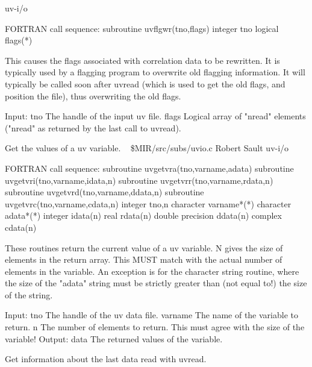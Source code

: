 \newline {} uv-i/o
\par{\tenpoint
{\eightpoint\begintt
FORTRAN call sequence:
        subroutine uvflgwr(tno,flags)
        integer tno
        logical flags(*)

  This causes the flags associated with correlation data to be rewritten.
  It is typically used by a flagging program to overwrite old flagging
  information. It will typically be called soon after uvread (which is
  used to get the old flags, and position the file), thus overwriting
  the old flags.

  Input:
    tno         The handle of the input uv file.
    flags       Logical array of "nread" elements ("nread" as returned
                by the last call to uvread).                            
\endtt}
\par}
%
\noindent Get the values of a uv variable.
\newline \ 
\newline {} \$MIR/src/subs/uvio.c
\newline {} Robert Sault
\newline {} uv-i/o
\par{\tenpoint
{\eightpoint\begintt
FORTRAN call sequence:
        subroutine uvgetvra(tno,varname,adata)
        subroutine uvgetvri(tno,varname,idata,n)
        subroutine uvgetvrr(tno,varname,rdata,n)
        subroutine uvgetvrd(tno,varname,ddata,n)
        subroutine uvgetvrc(tno,varname,cdata,n)
        integer tno,n
        character varname*(*)
        character adata*(*)
        integer   idata(n)
        real      rdata(n)
        double precision ddata(n)
        complex cdata(n)

  These routines return the current value of a uv variable. N gives the size
  of elements in the return array. This MUST match with the actual number
  of elements in the variable. An exception is for the character string
  routine, where the size of the "adata" string must be strictly greater
  than (not equal to!) the size of the string.

  Input:
    tno         The handle of the uv data file.
    varname     The name of the variable to return.
    n           The number of elements to return. This must agree with
                the size of the variable!
  Output:
    data        The returned values of the variable.                    
\endtt}
\par}
%
\noindent Get information about the last data read with uvread.
